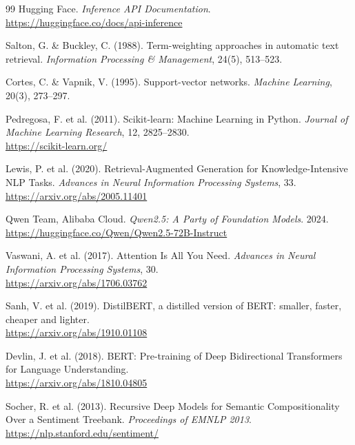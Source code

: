 \documentclass[12pt, a4paper, oneside]{report}
\begin{document}
\begin{thebibliography}{99}
Hugging Face. \textit{Inference API Documentation}.\\
\url{https://huggingface.co/docs/api-inference} 

Salton, G. \& Buckley, C. (1988). Term-weighting approaches in automatic text retrieval.
\textit{Information Processing \& Management}, 24(5), 513--523.

Cortes, C. \& Vapnik, V. (1995). Support-vector networks.
\textit{Machine Learning}, 20(3), 273--297.

Pedregosa, F. et al. (2011). Scikit-learn: Machine Learning in Python.
\textit{Journal of Machine Learning Research}, 12, 2825--2830.\\
\url{https://scikit-learn.org/} 

Lewis, P. et al. (2020). Retrieval-Augmented Generation for Knowledge-Intensive NLP Tasks.
\textit{Advances in Neural Information Processing Systems}, 33.\\
\url{https://arxiv.org/abs/2005.11401} 

Qwen Team, Alibaba Cloud. \textit{Qwen2.5: A Party of Foundation Models}. 2024.\\
\url{https://huggingface.co/Qwen/Qwen2.5-72B-Instruct} 

Vaswani, A. et al. (2017). Attention Is All You Need.
\textit{Advances in Neural Information Processing Systems}, 30.\\
\url{https://arxiv.org/abs/1706.03762} 

Sanh, V. et al. (2019). DistilBERT, a distilled version of BERT: smaller, faster, cheaper and lighter.\\
\url{https://arxiv.org/abs/1910.01108} 

Devlin, J. et al. (2018). BERT: Pre-training of Deep Bidirectional Transformers for Language Understanding.\\
\url{https://arxiv.org/abs/1810.04805} 

Socher, R. et al. (2013). Recursive Deep Models for Semantic Compositionality Over a Sentiment Treebank.
\textit{Proceedings of EMNLP 2013}.\\
\url{https://nlp.stanford.edu/sentiment/} 


\end{thebibliography}
\end{document}
